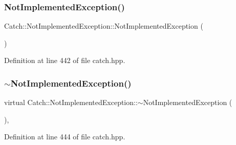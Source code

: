 \hypertarget{class_catch_1_1_not_implemented_exception_a508a7a833455da2d3c10ea1a9d45e982}{}\label{class_catch_1_1_not_implemented_exception_a508a7a833455da2d3c10ea1a9d45e982} 
\subsubsection{\texorpdfstring{Not\+Implemented\+Exception()}{NotImplementedException()}\hspace{0.1cm}{\footnotesize\ttfamily [2/2]}}
{\footnotesize\ttfamily Catch\+::\+Not\+Implemented\+Exception\+::\+Not\+Implemented\+Exception (\begin{DoxyParamCaption}\item[{\hyperlink{class_catch_1_1_not_implemented_exception}{Not\+Implemented\+Exception} const \&}]{ }\end{DoxyParamCaption})\hspace{0.3cm}{\ttfamily [inline]}}



Definition at line 442 of file catch.\+hpp.

\hypertarget{class_catch_1_1_not_implemented_exception_a557e7312aaa32c37bded019f2b059bcb}{}\label{class_catch_1_1_not_implemented_exception_a557e7312aaa32c37bded019f2b059bcb} 
\subsubsection{\texorpdfstring{$\sim$\+Not\+Implemented\+Exception()}{~NotImplementedException()}}
{\footnotesize\ttfamily virtual Catch\+::\+Not\+Implemented\+Exception\+::$\sim$\+Not\+Implemented\+Exception (\begin{DoxyParamCaption}{ }\end{DoxyParamCaption})\hspace{0.3cm}{\ttfamily [inline]}, {\ttfamily [virtual]}}



Definition at line 444 of file catch.\+hpp.



